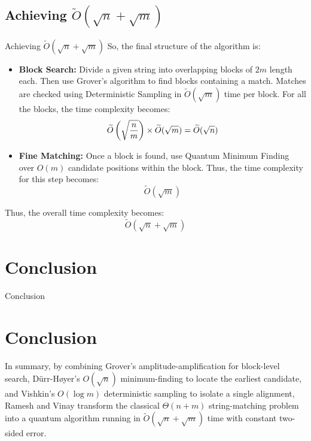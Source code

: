 \documentclass{beamer}
\begin{document}
\subsection{Achieving \texorpdfstring{$\widetilde{O}(\sqrt{n} + \sqrt{m})$}{O(sqrt(n)+sqrt(m))}}
\begin{frame}{Achieving \texorpdfstring{$\widetilde{O}(\sqrt{n} + \sqrt{m})$}{O(sqrt(n)+sqrt(m))}}
  So, the final structure of the algorithm is:
  \begin{itemize}
    \item \textbf{Block Search: }Divide a given string into overlapping blocks of $2m$ length each. Then use Grover's algorithm to find blocks containing a match. Matches are checked using Deterministic Sampling in $\widetilde{O}(\sqrt{m})$ time per block. For all the blocks, the time complexity becomes:
          \[
            \widetilde{O} \left(\sqrt{n \over m}\right) \times \widetilde{O}(\sqrt{m}) = \widetilde{O}(\sqrt{n})
          \]
    \item \textbf{Fine Matching: }Once a block is found, use Quantum Minimum Finding over $O(m)$ candidate positions within the block. Thus, the time complexity for this step becomes:
          \[
            \widetilde{O}(\sqrt{m})
          \]
  \end{itemize}
  Thus, the overall time complexity becomes:
  \[
    \widetilde{O}(\sqrt{n}+\sqrt{m})
  \]

\end{frame}


\section{Conclusion}
\begin{frame}{Conclusion}
  \section*{Conclusion}
  In summary, by combining Grover's amplitude-amplification for block-level search, Dürr-Høyer's \(O(\sqrt{n})\) minimum-finding to locate the earliest candidate, and Vishkin's \(O(\log m)\) deterministic sampling to isolate a single alignment, Ramesh and Vinay transform the classical \(\Theta(n + m)\) string-matching problem into a quantum algorithm running in \(\widetilde O(\sqrt{n} + \sqrt{m})\) time with constant two-sided error.

\end{frame}
\end{document}
